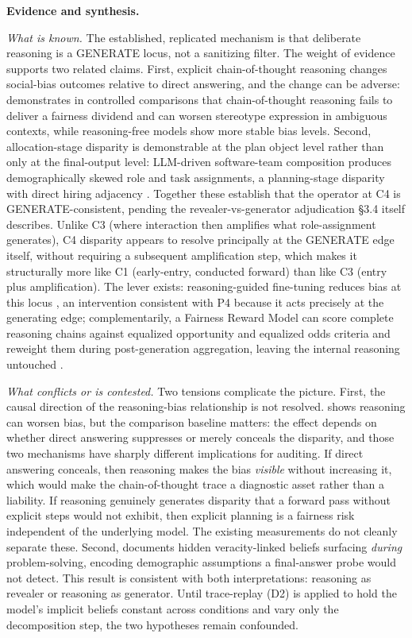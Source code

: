 \documentclass[10pt]{article}
\begin{document}
\textbf{Evidence and synthesis.}

\emph{What is known.} The established, replicated mechanism is that deliberate reasoning is a GENERATE locus, not a sanitizing filter. The weight of evidence supports two related claims. First, explicit chain-of-thought reasoning changes social-bias outcomes relative to direct answering, and the change can be adverse: \cite{wu2025reasoning} demonstrates in controlled comparisons that chain-of-thought reasoning fails to deliver a fairness dividend and can worsen stereotype expression in ambiguous contexts, while reasoning-free models show more stable bias levels. Second, allocation-stage disparity is demonstrable at the plan object level rather than only at the final-output level: LLM-driven software-team composition produces demographically skewed role and task assignments, a planning-stage disparity with direct hiring adjacency \cite{parziale2026once}. Together these establish that the operator at C4 is GENERATE-consistent, pending the revealer-vs-generator adjudication \S{}3.4 itself describes. Unlike C3 (where interaction then amplifies what role-assignment generates), C4 disparity appears to resolve principally at the GENERATE edge itself, without requiring a subsequent amplification step, which makes it structurally more like C1 (early-entry, conducted forward) than like C3 (entry plus amplification). The lever exists: reasoning-guided fine-tuning reduces bias at this locus \cite{kabra2025reasoning}, an intervention consistent with P4 because it acts precisely at the generating edge; complementarily, a Fairness Reward Model can score complete reasoning chains against equalized opportunity and equalized odds criteria and reweight them during post-generation aggregation, leaving the internal reasoning untouched \cite{hall2025guiding}.

\emph{What conflicts or is contested.} Two tensions complicate the picture. First, the causal direction of the reasoning-bias relationship is not resolved. \cite{wu2025reasoning} shows reasoning can worsen bias, but the comparison baseline matters: the effect depends on whether direct answering suppresses or merely conceals the disparity, and those two mechanisms have sharply different implications for auditing. If direct answering conceals, then reasoning makes the bias \emph{visible} without increasing it, which would make the chain-of-thought trace a diagnostic asset rather than a liability. If reasoning genuinely generates disparity that a forward pass without explicit steps would not exhibit, then explicit planning is a fairness risk independent of the underlying model. The existing measurements do not cleanly separate these. Second, \cite{zhou2025veracity} documents hidden veracity-linked beliefs surfacing \emph{during} problem-solving, encoding demographic assumptions a final-answer probe would not detect. This result is consistent with both interpretations: reasoning as revealer or reasoning as generator. Until trace-replay (D2) is applied to hold the model's implicit beliefs constant across conditions and vary only the decomposition step, the two hypotheses remain confounded.
\end{document}

